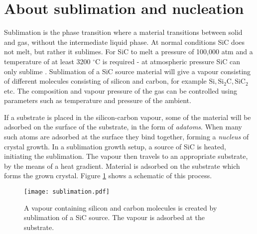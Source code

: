  \section{About sublimation and nucleation}
 Sublimation is the phase transition where a material transitions between solid and gas, without the intermediate liquid phase. At normal conditions SiC does not melt, but rather it sublimes. For SiC to melt a pressure of 100,000 atm and a temperature of at least 3200 $^\circ$C is required - at atmospheric pressure SiC can only sublime \cite{Scheel2003}. Sublimation of a SiC source material will give a vapour consisting of different molecules consisting of silicon and carbon, for example $\mathrm{Si, Si_2C, SiC_2}$ etc. The composition and vapour pressure of the gas can be controlled using parameters such as temperature and pressure of the ambient. 
 
If a substrate is placed in the silicon-carbon vapour, some of the material will be adsorbed on the surface of the substrate, in the form of \emph{adatoms}. When many such atoms are adsorbed at the surface they bind together, forming a \emph{nucleus} of crystal growth. In a sublimation growth setup, a source of SiC is heated, initiating the sublimation. The vapour then travels to an appropriate substrate, by the means of a heat gradient. Material is adsorbed on the substrate which forms the grown crystal. Figure \ref{fig:sublimation} shows a schematic of this process. 

\begin{figure}[h]
\begin{center}
\texttt{[image: sublimation.pdf]}
\caption{A vapour containing silicon and carbon molecules is created by sublimation of a SiC source. The vapour is adsorbed at the substrate. 
\label{fig:sublimation}}
\end{center}
\end{figure}
 
